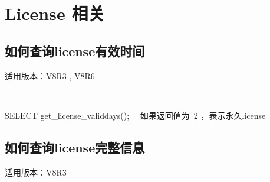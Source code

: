 \documentclass[letterpaper,10pt,english]{sphinxmanual}
\begin{document}
\chapter{License 相关}
\label{\detokenize{license:license}}\label{\detokenize{license::doc}}

\section{如何查询license有效时间}
\label{\detokenize{license:id1}}
适用版本：V8R3 , V8R6

\begin{sphinxVerbatim}[commandchars=\\\{\}]
 
\end{sphinxVerbatim}

SELECT get\_license\_validdays();   如果返回值为 \sphinxhyphen{}2 ，表示永久license


\section{如何查询license完整信息}
\label{\detokenize{license:id2}}
适用版本：V8R3
\end{document}
